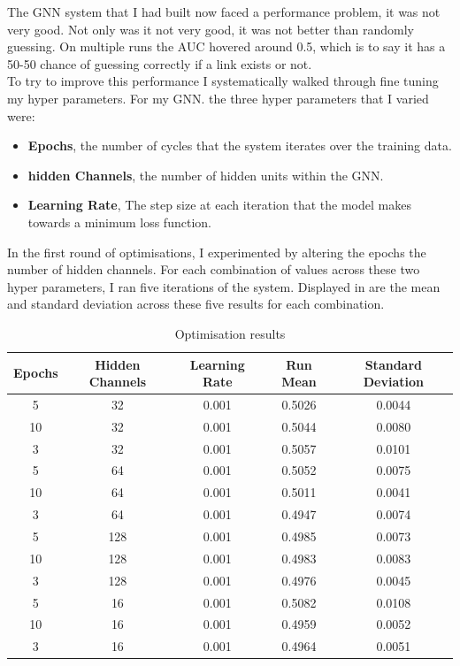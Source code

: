 \documentclass{l4proj}
\begin{document}
The GNN system that I had built now faced a performance problem, it was not very good. Not only was it not very good, it was not better than randomly guessing. On multiple runs the AUC hovered around 0.5, which is to say it has a 50-50 chance of guessing correctly if a link exists or not. \\

To try to improve this performance I systematically walked through fine tuning my hyper parameters. For my GNN. the three hyper parameters that I varied were:
\\
\begin{itemize}
    \item \textbf{Epochs}, the number of cycles that the system iterates over the training data.
    \item \textbf{hidden Channels}, the number of hidden units within the GNN.
    \item \textbf{Learning Rate}, The step size at each iteration that the model makes towards a minimum loss function.\\
\end{itemize}

In the first round of optimisations, I experimented by altering the epochs the number of hidden channels. For each combination of values across these two hyper parameters, I ran five iterations of the system. Displayed in  are the mean and standard deviation across these five results for each combination. \\

\begin{table}[h]
    \centering
    \caption{Optimisation results}
    \label{tab:Optimisation_results}
    \begin{tabular}{|c|c|c|c|c|}
        \hline
        \textbf{Epochs} & \textbf{Hidden Channels} & \textbf{Learning Rate} & \textbf{Run Mean} & \textbf{Standard Deviation} \\ \hline
        5 & 32 & 0.001 & 0.5026 & 0.0044 \\ \hline
        10 & 32 & 0.001 & 0.5044 & 0.0080 \\ \hline
        3 & 32 & 0.001 & 0.5057 & 0.0101 \\ \hline
        5 & 64 & 0.001 & 0.5052 & 0.0075 \\ \hline
        10 & 64 & 0.001 &0.5011 & 0.0041 \\ \hline
        3 & 64 & 0.001 & 0.4947 & 0.0074 \\ \hline
        5 & 128 & 0.001 & 0.4985 & 0.0073 \\ \hline
        10 & 128 & 0.001 & 0.4983 & 0.0083 \\ \hline
        3 & 128 & 0.001 & 0.4976 & 0.0045 \\ \hline
        5 & 16 & 0.001 & 0.5082 & 0.0108 \\ \hline
        10 & 16 & 0.001 & 0.4959 & 0.0052 \\ \hline
        3 & 16 & 0.001 & 0.4964 & 0.0051 \\ \hline
    \end{tabular}
\end{table}
\end{document}

